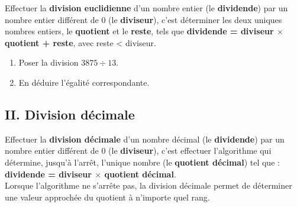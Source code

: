 \begin{Définition*}[c]
Effectuer la \textbf{division euclidienne} d'un nombre entier (le \textbf{dividende}) par un nombre entier différent de $0$ (le \textbf{diviseur}), c'est déterminer les deux uniques nombres entiers, le \textbf{quotient} et le \textbf{reste}, tels que \textcolor{Couleur6}{\textbf{dividende = diviseur $\times$ quotient + reste}}, avec reste < diviseur.
\end{Définition*}

\begin{Exemple}
\begin{minipage}{0.6\textwidth}
\begin{enumerate}
\item Poser la division $3875 \div 13$.
\item En déduire l'égalité correspondante. 

\ligne

\ligne

\ligne


\end{enumerate}
\end{minipage}
\hfill
\begin{minipage}{0.4\textwidth}
\begin{center}
\end{center}
\end{minipage}

\end{Exemple}



\newpage

\subsection*{II. Division décimale}

\begin{Définition*}
Effectuer la \textbf{division décimale} d'un nombre décimal (le \textbf{dividende}) par un nombre entier différent de $0$ (le \textbf{diviseur}), c'est effectuer l'algorithme qui détermine, jusqu'à l'arrêt, l'unique nombre (le \textbf{quotient décimal}) tel que : \textcolor{Couleur6}{\textbf{dividende = diviseur $\times$ quotient décimal}}.\\
Lorsque l'algorithme ne s'arrête pas, la division décimale permet de déterminer une valeur approchée du quotient à n'importe quel rang.
\end{Définition*}


